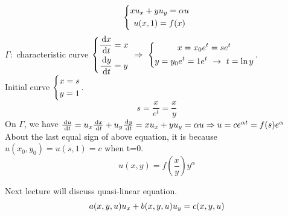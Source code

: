 \begin{example}
\[\left \{\begin{gathered}xu_x+yu_y=\alpha u\\u(x,1)=f(x)\end{gathered}\right.
\]
$\Gamma:$ characteristic curve $\left\{\begin{gathered}\frac{\,\mathrm{d} x}{\,\mathrm{d} t}=x\\\frac{\,\mathrm{d} y}{\,\mathrm{d} t}=y\end{gathered}\right.~\Rightarrow~\left\{\begin{gathered}x=x_0e^t=se^t\\y=y_0e^t=1e^t~\rightarrow~t=\ln y\end{gathered}\right.$.\\
Initial curve $\left\{\begin{gathered}x=s\\y=1\end{gathered}\right.$.\\
\[s=\frac{x}{e^t}=\frac{x}{y}
\]
On $\Gamma$, we have $\frac{\,\mathrm{d} u}{\,\mathrm{d} t}=u_x\frac{\,\mathrm{d} x}{\,\mathrm{d} t}+u_y\frac{\,\mathrm{d} y}{\,\mathrm{d} t}=xu_x+yu_y=\alpha u\Rightarrow u=ce^{\alpha t}=f(s)e^{\alpha}$
About the last equal sign of above equation, it is because $u(x_0,y_0)=u(s,1)=c$ when t=0.
\[u(x,y)=f(\frac{x}{y})y^\alpha
\]


\end{example}
Next lecture will discuss quasi-linear equation.
\[a(x,y,u)u_x+b(x,y,u)u_y=c(x,y,u)
\]



